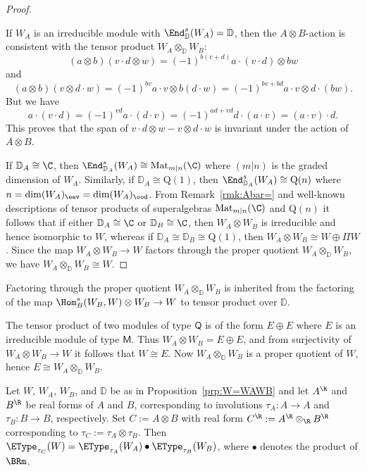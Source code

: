 \documentclass[12pt]{amsart}
\begin{document}
\begin{proof}
\begin{details}
If $W_A$ is an irreducible module with $\End_\mathbb D^s(W_A)=\mathbb D$, then the $A\otimes B$-action is consistent with the tensor product $W_A\otimes_\mathbb D W_B$:
\[
(a\otimes b)(v\cdot d\otimes w)=(-1)^{b(v+d)}a\cdot (v\cdot d)\otimes bw
\]
and 
\[
(a\otimes b)(v\otimes d\cdot w)=(-1)^{bv}a\cdot v\otimes b(d\cdot w)=(-1)^{bv+bd}a\cdot v\otimes d\cdot (bw).
\]
But we have 
\[
a\cdot (v\cdot d)=(-1)^{vd}a\cdot (d\cdot v)=(-1)^{ad+vd}d\cdot (a\cdot v)=(a\cdot v)\cdot d. 
\]
This proves that the span of $v\cdot d\otimes w-v\otimes d\cdot w$ is invariant under the action of $A\otimes B$. 
\end{details}

If  $\mathbb D_A\cong\C$, then $\End_{\mathbb D_A}^s(W_A)\cong \mathrm{Mat}_{m|n}(\C)$ where $(m|n)$ is the graded dimension of $W_A$. Similarly, if $\mathbb D_A\cong\mathrm{Q}(1)$, then $\End_{\mathbb D_A}^s(W_A)\cong \mathrm{Q}(n)$ where $n=\dim (W_A)_\eev=\dim (W_A)_\ood$. From 
Remark~\ref{rmk:Abar=} and 
well-known descriptions of tensor products of superalgebras $\mathrm{Mat}_{m|n}(\C)$ and $\mathrm{Q}(n)$ it follows that if either $\mathbb D_A\cong\C$ or $\mathbb D_B\cong\C$, then $W_A\otimes W_B$ is irreducible and hence isomorphic to $W$, whereas if $\mathbb D_A\cong \mathbb D_B\cong \mathrm{Q}(1)$, then 
$W_A\otimes W_B\cong W\oplus \Pi W$. Since the map $W_A\otimes W_B\to W$ factors through the proper quotient $W_A\otimes_\mathbb D W_B$, we have $ W_A\otimes_{\mathbb D} W_B\cong W$.
\end{proof}

\begin{details}
Factoring through the proper quotient $W_A\otimes_{\mathbb D} W_B$ is inherited from the factoring of the map $\Hom^s_B(W_B,W)\otimes  W_B\to W$ to tensor product over $\mathbb D$. 

The tensor product of two modules of type $\mathsf Q$ is of the form $E\oplus E$ where $E$ is an irreducible module of type $\mathsf M$. Thus $W_A\otimes W_B=E\oplus E$, and from surjectivity of $W_A\otimes W_B\to W$ it follows that $W\cong E$. Now $W_A\otimes_\mathbb D W_B$ is a proper quotient of $W$, hence $E\cong W_A\otimes_\mathbb D W_B$. 
\end{details}

\begin{prp}
\label{prp:EtypeofWWAWB}
Let $W$, $W_A$, $W_B$, and $\mathbb D$ be as in Proposition~\ref{prp:W=WAWB} and let $A^\R$ and $B^\R$ be real forms of $A$ and $B$, corresponding to involutions $\tau_A:A\to A$ and $\tau_B:B\to B$, respectively. 
Set $C:=A\otimes B$ with real form $C^\R:=A^\R\otimes_\R B^\R$ corresponding to  $\tau_C:=\tau_A\otimes \tau_B$. 
Then $\EType_{{\tau_C}}(W)=\EType_{{\tau_A}}(W_A)\bullet\EType_{{\tau_B}}(W_B)$, where $\bullet$ denotes the product of $\BRm$. 
\end{prp}
\end{document}
